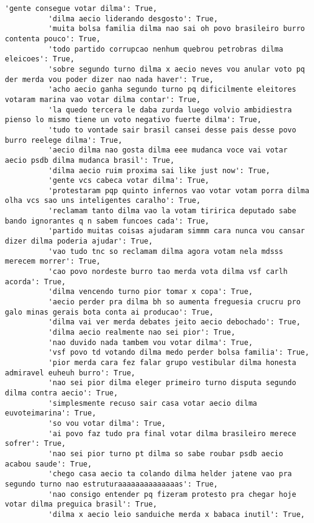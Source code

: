 \documentclass[11pt]{article}
\begin{document}
\begin{Verbatim}[commandchars=\\\{\}]
          'gente consegue votar dilma': True,
          'dilma aecio liderando desgosto': True,
          'muita bolsa familia dilma nao sai oh povo brasileiro burro contenta pouco': True,
          'todo partido corrupcao nenhum quebrou petrobras dilma eleicoes': True,
          'sobre segundo turno dilma x aecio neves vou anular voto pq der merda vou poder dizer nao nada haver': True,
          'acho aecio ganha segundo turno pq dificilmente eleitores votaram marina vao votar dilma contar': True,
          'la quedo tercera le daba zurda luego volvio ambidiestra pienso lo mismo tiene un voto negativo fuerte dilma': True,
          'tudo to vontade sair brasil cansei desse pais desse povo burro reelege dilma': True,
          'aecio dilma nao gosta dilma eee mudanca voce vai votar aecio psdb dilma mudanca brasil': True,
          'dilma aecio ruim proxima sai like just now': True,
          'gente vcs cabeca votar dilma': True,
          'protestaram pqp quinto infernos vao votar votam porra dilma olha vcs sao uns inteligentes caralho': True,
          'reclamam tanto dilma vao la votam tiririca deputado sabe bando ignorantes q n sabem funcoes cada': True,
          'partido muitas coisas ajudaram simmm cara nunca vou cansar dizer dilma poderia ajudar': True,
          'vao tudo tnc so reclamam dilma agora votam nela mdsss merecem morrer': True,
          'cao povo nordeste burro tao merda vota dilma vsf carlh acorda': True,
          'dilma vencendo turno pior tomar x copa': True,
          'aecio perder pra dilma bh so aumenta freguesia crucru pro galo minas gerais bota conta ai producao': True,
          'dilma vai ver merda debates jeito aecio debochado': True,
          'dilma aecio realmente nao sei pior': True,
          'nao duvido nada tambem vou votar dilma': True,
          'vsf povo td votando dilma medo perder bolsa familia': True,
          'pior merda cara fez falar grupo vestibular dilma honesta admiravel euheuh burro': True,
          'nao sei pior dilma eleger primeiro turno disputa segundo dilma contra aecio': True,
          'simplesmente recuso sair casa votar aecio dilma euvoteimarina': True,
          'so vou votar dilma': True,
          'ai povo faz tudo pra final votar dilma brasileiro merece sofrer': True,
          'nao sei pior turno pt dilma so sabe roubar psdb aecio acabou saude': True,
          'chego casa aecio ta colando dilma helder jatene vao pra segundo turno nao estruturaaaaaaaaaaaaaas': True,
          'nao consigo entender pq fizeram protesto pra chegar hoje votar dilma preguica brasil': True,
          'dilma x aecio leio sanduiche merda x babaca inutil': True,

\end{Verbatim}
\end{document}
